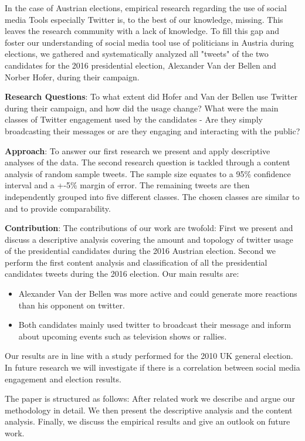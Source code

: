 \documentclass{llncs}
\begin{document}
In the case of Austrian elections, empirical research regarding the use of social media Tools especially Twitter is, to the best of our knowledge, missing. This leaves the research community with a lack of knowledge. To fill this gap and foster our understanding of social media tool use of politicians in Austria during elections, we gathered and systematically analyzed all "tweets" of the two candidates for the 2016 presidential election, Alexander Van der Bellen and Norber Hofer, during their campaign. 

\textbf{Research Questions}: To what extent did Hofer and Van der Bellen use Twitter during their campaign, and how did the usage change? What were the main classes of Twitter engagement used by the candidates - Are they simply broadcasting their messages or are they engaging and interacting with the public?

\textbf{Approach}: To answer our first research we present and apply descriptive analyses of the data. The second research question is tackled through a content analysis of random sample tweets. The sample size equates to a 95\% confidence interval and a +-5\% margin of error. The remaining tweets are then independently grouped into five different classes. The chosen classes are similar to \cite{larsson2012studying} and \cite{miller2015studying} to provide comparability. 

\textbf{Contribution}: The contributions of our work are twofold: First we present and discuss a descriptive analysis covering the amount and topology of twitter usage of the presidential candidates during the 2016 Austrian election. Second we perform the first content analysis and classification of all the presidential candidates tweets during the 2016 election.
Our main results are: 
\begin{itemize} 
	\item Alexander Van der Bellen was more active and could generate more reactions than his opponent on twitter.
	\item Both candidates mainly used twitter to broadcast their message and inform about upcoming events such as television shows or rallies.  
\end{itemize}

Our results are in line with a study performed for the 2010 UK general election\cite{graham2013between}. In future research we will investigate if there is a correlation between social media engagement and election results.

The paper is structured as follows: After related work we describe and argue our methodology in detail. We then present the descriptive analysis and the content analysis. Finally, we discuss the empirical results and give an outlook on future work.
\end{document}
